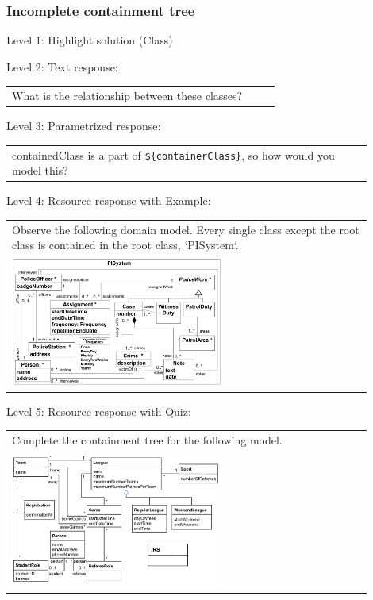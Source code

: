 \subsubsection{Incomplete containment tree}

\noindent Level 1: Highlight solution (Class) \medskip

\noindent Level 2: Text response: \medskip

\begin{tabular}{|p{0.9\linewidth}}
What is the relationship between these classes?
\end{tabular} \medskip

\noindent Level 3: Parametrized response: \medskip

\begin{tabular}{|p{0.9\linewidth}}
{containedClass} is a part of \verb|${containerClass}|, so how would you model this?
\end{tabular} \medskip

\noindent Level 4: Resource response with Example: \medskip

\begin{tabular}{|p{0.9\linewidth}}
Observe the following domain model. Every single class except the root class is contained in the 
root class, `PISystem`.

\\
\includegraphics[width=0.6\textwidth]{images/PISystem.png}
\end{tabular} \medskip

\noindent Level 5: Resource response with Quiz: \medskip

\begin{tabular}{|p{0.9\linewidth}}
Complete the containment tree for the following model.

\\
\includegraphics[width=0.6\textwidth]{images/IRS.png}
\end{tabular} \medskip

